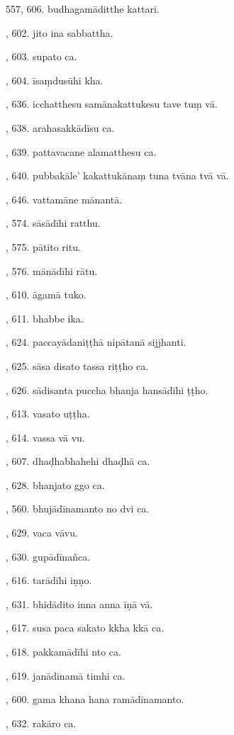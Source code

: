 557, 606. budhagamāditthe kattari.\par {}, 602. jito ina sabbattha.\par {}, 603. supato ca.\par {}, 604. īsaṃdusūhi kha.\par {}, 636. icchatthesu samānakattukesu tave tuṃ vā.\par {}, 638. arahasakkādīsu ca.\par {}, 639. pattavacane alamatthesu ca.\par {}, 640. pubbakāle’ kakattukānaṃ tuna tvāna tvā vā.\par {}, 646. vattamāne mānantā.\par {}, 574. sāsādīhi ratthu.\par {}, 575. pātito ritu.\par {}, 576. mānādīhi rātu.\par {}, 610. āgamā tuko.\par {}, 611. bhabbe ika.\par {}, 624. paccayādaniṭṭhā nipātanā sijjhanti.\par {}, 625. sāsa disato tassa riṭṭho ca.\par {}, 626. sādisanta puccha bhanja hansādīhi ṭṭho.\par {}, 613. vasato uṭṭha.\par {}, 614. vassa vā vu.\par {}, 607. dhaḍhabhahehi dhaḍhā ca.\par {}, 628. bhanjato ggo ca.\par {}, 560. bhujādīnamanto no dvi ca.\par {}, 629. vaca vāvu.\par {}, 630. gupādīnañca.\par {}, 616. tarādīhi iṇṇo.\par {}, 631. bhidādito inna anna īṇā vā.\par {}, 617. susa paca sakato kkha kkā ca.\par {}, 618. pakkamādīhi nto ca.\par {}, 619. janādīnamā timhi ca.\par {}, 600. gama khana hana ramādīnamanto.\par {}, 632. rakāro ca.\par \noindent
